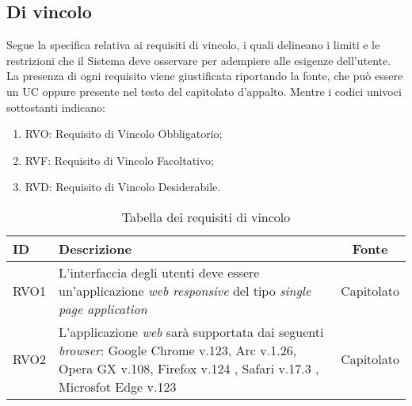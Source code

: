\subsection{Di vincolo}

Segue la specifica relativa ai requisiti di vincolo, i quali delineano i limiti e le restrizioni che il Sistema deve osservare per adempiere alle esigenze dell'utente.
La presenza di ogni requisito viene giustificata riportando la fonte, che può essere un UC oppure presente
nel testo del capitolato d'appalto. Mentre i codici univoci sottostanti indicano:
\begin{enumerate}
	\item RVO: Requisito di Vincolo Obbligatorio;
	\item RVF: Requisito di Vincolo Facoltativo;
	\item RVD: Requisito di Vincolo Desiderabile.
\end{enumerate}

\begin{table}[H]
	\renewcommand{\arraystretch}{1.5}
	\centering
	\begin{tabularx}{\textwidth}{l|X|c}
		\textbf{ID} & \textbf{Descrizione}                                                                                                     & \textbf{Fonte} \\
		\hline
		RVO1        & L'interfaccia degli utenti deve essere un'applicazione \textit{web responsive} del tipo \textit{single page application} & Capitolato     \\
		\hline
		RVO2        & L'applicazione \textit{web} sarà supportata dai seguenti \textit{browser}: Google Chrome v.123, Arc v.1.26, Opera GX v.108, Firefox v.124 , Safari v.17.3 , Microsfot Edge v.123  & Capitolato     \\
		\hline
	\end{tabularx}
	\caption{Tabella dei requisiti di vincolo}
\end{table}
